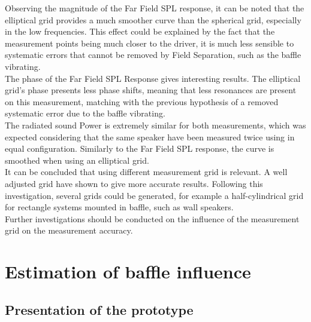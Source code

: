 \documentclass{report}
\begin{document}
Observing the magnitude of the Far Field SPL response, it can be noted that the elliptical grid provides a much smoother curve than the spherical grid, especially in the low frequencies. This effect could be explained by the fact that the measurement points being much closer to the driver, it is much less sensible to systematic errors that cannot be removed by Field Separation, such as the baffle vibrating. \\

The phase of the Far Field SPL Response gives interesting results. The elliptical grid's phase presents less phase shifts, meaning that less resonances are present on this measurement, matching with the previous hypothesis of a removed systematic error due to the baffle vibrating. \\

The radiated sound Power is extremely similar for both measurements, which was expected considering that the same speaker have been measured twice using in equal configuration. Similarly to the Far Field SPL response, the curve is smoothed when using an elliptical grid. \\

It can be concluded that using different measurement grid is relevant. A well adjusted grid have shown to give more accurate results. Following this investigation, several grids could be generated, for example a half-cylindrical grid for rectangle systems mounted in baffle, such as wall speakers.\\
Further investigations should be conducted on the influence of the measurement grid on the measurement accuracy.



\section{Estimation of baffle influence}

\subsection{Presentation of the prototype}
\end{document}
